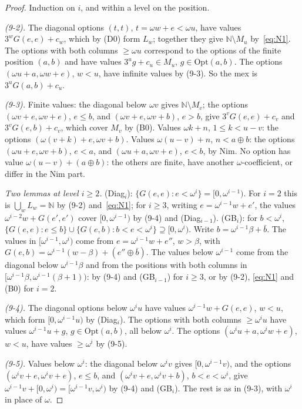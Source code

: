 \documentclass[11pt]{amsart}
\theoremstyle{definition}
\theoremstyle{remark}
\newcommand{\G}{G}
\newcommand{\nim}{\oplus}
\begin{document}
\begin{proof}
Induction on $i$, and within a level on the position.

\emph{(9-2).} The diagonal options $(t,t)$, $t=\omega w+e<\omega u$, have values
$3^w\G(e,e)+c_w$, which by (D0) form $L_w$; together they give $\mathbb N\setminus M_u$
by~\eqref{eq:N1}. The options with both columns $\ge\omega u$ correspond to the options of the
finite position $(a,b)$ and have values $3^ug+c_u\in M_u$, $g\in\mathrm{Opt}(a,b)$. The options
$(\omega u+a,\omega w+e)$, $w<u$, have infinite values by (9-3). So the mex is
$3^u\G(a,b)+c_u$.

\emph{(9-3).} Finite values: the diagonal below $\omega v$ gives $\mathbb N\setminus M_v$; the
options $(\omega v+e,\omega v+e)$, $e\le b$, and $(\omega v+e,\omega v+b)$, $e>b$, give
$3^v\G(e,e)+c_v$ and $3^v\G(e,b)+c_v$, which cover $M_v$ by (B0). Values $\omega k+n$,
$1\le k<u-v$: the options $(\omega(v+k)+e,\omega v+b)$. Values $\omega(u-v)+n$, $n<a\nim b$: the
options $(\omega u+e,\omega v+b)$, $e<a$, and $(\omega u+a,\omega v+e)$, $e<b$, by Nim. No option
has value $\omega(u-v)+(a\nim b)$: the others are finite, have another $\omega$-coefficient, or
differ in the Nim part.

\emph{Two lemmas at level $i\ge2$.} (Diag$_i$): $\{\G(e,e):e<\omega^i\}=[0,\omega^{i-1})$. For
$i=2$ this is $\bigcup_wL_w=\mathbb N$ by (9-2) and~\eqref{eq:N1}; for $i\ge3$, writing
$e=\omega^{i-1}w+e'$, the values $\omega^{i-2}w+\G(e',e')$ cover $[0,\omega^{i-1})$ by (9-4) and
(Diag$_{i-1}$). (GB$_i$): for $b<\omega^i$,
$\{\G(e,e):e\le b\}\cup\{\G(e,b):b<e<\omega^i\}\supseteq[0,\omega^i)$. Write
$b=\omega^{i-1}\beta+\bar b$. The values in $[\omega^{i-1},\omega^i)$ come from
$e=\omega^{i-1}w+e''$, $w>\beta$, with $\G(e,b)=\omega^{i-1}(w-\beta)+(e''\nim\bar b)$. The
values below $\omega^{i-1}$ come from the diagonal below $\omega^{i-1}\beta$ and from the
positions with both columns in $[\omega^{i-1}\beta,\omega^{i-1}(\beta+1))$: by (9-4) and
(GB$_{i-1}$) for $i\ge3$, or by (9-2), \eqref{eq:N1} and (B0) for $i=2$.

\emph{(9-4).} The diagonal options below $\omega^iu$ have values $\omega^{i-1}w+\G(e,e)$,
$w<u$, which form $[0,\omega^{i-1}u)$ by (Diag$_i$). The options with both columns
$\ge\omega^iu$ have values $\omega^{i-1}u+g$, $g\in\mathrm{Opt}(a,b)$, all below $\omega^i$. The
options $(\omega^iu+a,\omega^iw+e)$, $w<u$, have values $\ge\omega^i$ by (9-5).

\emph{(9-5).} Values below $\omega^i$: the diagonal below $\omega^iv$ gives
$[0,\omega^{i-1}v)$, and the options $(\omega^iv+e,\omega^iv+e)$, $e\le b$, and
$(\omega^iv+e,\omega^iv+b)$, $b<e<\omega^i$, give $\omega^{i-1}v+[0,\omega^i)=[\omega^{i-1}v,\omega^i)$
by (9-4) and (GB$_i$). The rest is as in (9-3), with $\omega^i$ in place of $\omega$.
\end{proof}
\end{document}
